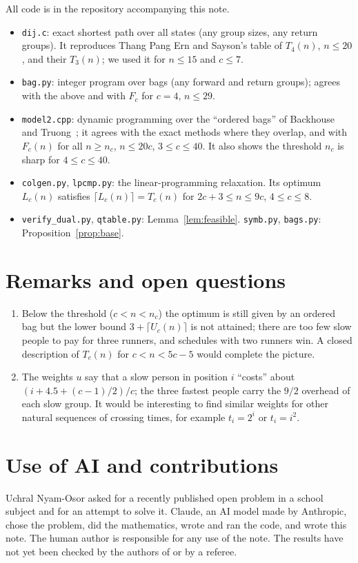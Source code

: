 \documentclass[11pt]{article}
\theoremstyle{remark}
\begin{document}
All code is in the repository accompanying this note.
\begin{itemize}
\item \texttt{dij.c}: exact shortest path over all states (any group sizes, any return groups). It reproduces Thang Pang Ern and Sayson's table of $T_4(n)$, $n\le20$, and their $T_3(n)$; we used it for $n\le 15$ and $c\le7$.
\item \texttt{bag.py}: integer program over bags (any forward and return groups); agrees with the above and with $F_c$ for $c=4$, $n\le29$.
\item \texttt{model2.cpp}: dynamic programming over the ``ordered bags'' of Backhouse and Truong~\cite[Theorems 2--3]{bt15}; it agrees with the exact methods where they overlap, and with $F_c(n)$ for all $n\ge n_c$, $n\le 20c$, $3\le c\le40$. It also shows the threshold $n_c$ is sharp for $4\le c\le40$.
\item \texttt{colgen.py}, \texttt{lpcmp.py}: the linear-programming relaxation. Its optimum $L_c(n)$ satisfies $\lceil L_c(n)\rceil=T_c(n)$ for $2c+3\le n\le 9c$, $4\le c\le8$.
\item \texttt{verify\_dual.py}, \texttt{qtable.py}: Lemma~\ref{lem:feasible}. \texttt{symb.py}, \texttt{bags.py}: Proposition~\ref{prop:base}.
\end{itemize}

\section{Remarks and open questions}
\begin{enumerate}
\item Below the threshold ($c<n<n_c$) the optimum is still given by an ordered bag but the lower bound $3+\lceil U_c(n)\rceil$ is not attained; there are too few slow people to pay for three runners, and schedules with two runners win. A closed description of $T_c(n)$ for $c<n<5c-5$ would complete the picture.
\item The weights $u$ say that a slow person in position $i$ ``costs'' about $(i+4.5+(c-1)/2)/c$; the three fastest people carry the $9/2$ overhead of each slow group. It would be interesting to find similar weights for other natural sequences of crossing times, for example $t_i=2^{i}$ or $t_i=i^2$.
\end{enumerate}

\section*{Use of AI and contributions}
Uchral Nyam-Osor asked for a recently published open problem in a school subject and for an attempt to solve it. Claude, an AI model made by Anthropic, chose the problem, did the mathematics, wrote and ran the code, and wrote this note. The human author is responsible for any use of the note. The results have not yet been checked by the authors of \cite{pes} or by a referee.
\end{document}
